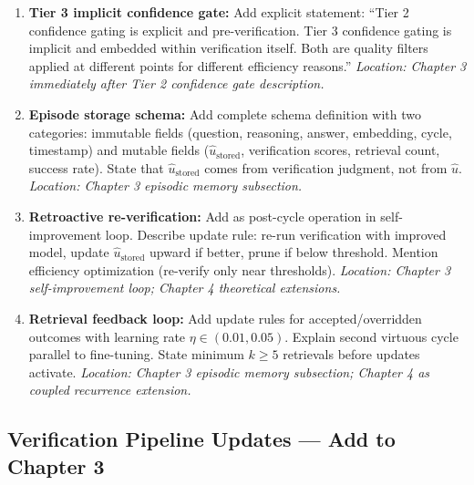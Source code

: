 \documentclass[11pt,a4paper]{article}
\newcommand{\uhat}{\hat{u}}
\newcommand{\ustored}{\hat{u}_{\text{stored}}}
\begin{document}
\begin{enumerate}
\item \textbf{Tier 3 implicit confidence gate:} Add explicit statement: ``Tier 2 confidence gating is explicit and pre-verification. Tier 3 confidence gating is implicit and embedded within verification itself. Both are quality filters applied at different points for different efficiency reasons.'' \textit{Location: Chapter 3 immediately after Tier 2 confidence gate description.}

\item \textbf{Episode storage schema:} Add complete schema definition with two categories: immutable fields (question, reasoning, answer, embedding, cycle, timestamp) and mutable fields ($\ustored$, verification scores, retrieval count, success rate). State that $\ustored$ comes from verification judgment, not from $\uhat$. \textit{Location: Chapter 3 episodic memory subsection.}

\item \textbf{Retroactive re-verification:} Add as post-cycle operation in self-improvement loop. Describe update rule: re-run verification with improved model, update $\ustored$ upward if better, prune if below threshold. Mention efficiency optimization (re-verify only near thresholds). \textit{Location: Chapter 3 self-improvement loop; Chapter 4 theoretical extensions.}

\item \textbf{Retrieval feedback loop:} Add update rules for accepted/overridden outcomes with learning rate $\eta \in (0.01, 0.05)$. Explain second virtuous cycle parallel to fine-tuning. State minimum $k \geq 5$ retrievals before updates activate. \textit{Location: Chapter 3 episodic memory subsection; Chapter 4 as coupled recurrence extension.}
\end{enumerate}

\subsection{Verification Pipeline Updates — Add to Chapter 3}
\end{document}
